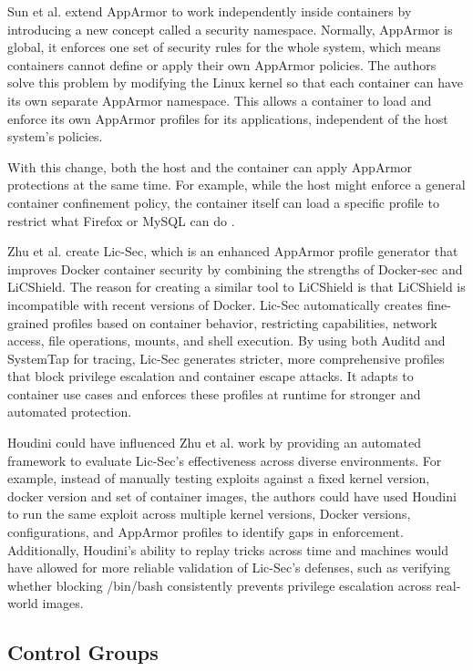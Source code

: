 \begin{doublespace}
Sun et al. \cite{sun2018security} extend AppArmor to work independently inside containers by introducing a new concept called a security namespace. Normally, AppArmor is global, it enforces one set of security rules for the whole system, which means containers cannot define or apply their own AppArmor policies. The authors solve this problem by modifying the Linux kernel so that each container can have its own separate AppArmor namespace. This allows a container to load and enforce its own AppArmor profiles for its applications, independent of the host system's policies.

With this change, both the host and the container can apply AppArmor protections at the same time. For example, while the host might enforce a general container confinement policy, the container itself can load a specific profile to restrict what Firefox or MySQL can do \cite{sun2018security}. 

Zhu et al. \cite{zhu2021lic} create Lic-Sec, which is an enhanced AppArmor profile generator that improves Docker container security by combining the strengths of Docker-sec and LiCShield. The reason for creating a similar tool to LiCShield is that LiCShield is incompatible with recent versions of Docker. Lic-Sec automatically creates fine-grained profiles based on container behavior, restricting capabilities, network access, file operations, mounts, and shell execution. By using both Auditd and SystemTap for tracing, Lic-Sec generates stricter, more comprehensive profiles that block privilege escalation and container escape attacks. It adapts to container use cases and enforces these profiles at runtime for stronger and automated protection.

Houdini could have influenced Zhu et al. \cite{zhu2021lic} work by providing an automated framework to evaluate Lic-Sec's effectiveness across diverse environments. For example, instead of manually testing exploits against a fixed kernel version, docker version and set of container images, the authors could have used Houdini to run the same exploit across multiple kernel versions, Docker versions, configurations, and AppArmor profiles to identify gaps in enforcement. Additionally, Houdini’s ability to replay tricks across time and machines would have allowed for more reliable validation of Lic-Sec’s defenses, such as verifying whether blocking /bin/bash consistently prevents privilege escalation across real-world images.



\subsection{Control Groups}


\end{doublespace}

